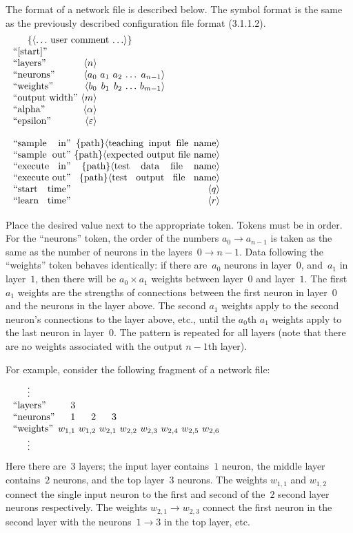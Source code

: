 \documentclass[12pt]{report}
\begin{document}
The format of a network file is described below.
The symbol format is the same as the previously described
configuration file format (3.1.1.2).
$$\vbox{
\halign{#&&\ #\cr
	\noalign{$\{\langle \ldots$ user comment $\ldots \rangle\}$}
	\noalign{}
	``[start]''\cr
	\noalign{}
	``layers''&$\langle n\rangle$\cr
	``neurons''&$\langle a_0$&$a_1$&$a_2$&$\ldots$&$a_{n-1}\rangle$\cr
	``weights''&$\langle b_0$&$b_1$&$b_2$&$\ldots$&$b_{m-1}\rangle$\cr
	\noalign{}
	``output width''&$\langle m\rangle$\cr
	\noalign{}
	``alpha''&$\langle\alpha\rangle$\cr
	``epsilon''&$\langle\varepsilon\rangle$\cr
}}
$$
$$\vbox{
\halign{#&\ #\cr
	\noalign{$\quad$}
	``sample in''&$\{$path$\}\langle$teaching input file name$\rangle$\cr
	``sample out''&$\{$path$\}\langle$expected output file name$\rangle$\cr
	\noalign{}
	``execute in''&$\{$path$\}\langle$test data file name$\rangle$\cr
	``execute out''&$\{$path$\}\langle$test output file name$\rangle$\cr
	\noalign{}
	``start time''&$\langle q\rangle$\cr
	``learn time''&$\langle r\rangle$\cr
}}
$$

Place the desired value next to the appropriate token.
Tokens must be in order.
For the ``neurons'' token, the order of the numbers $a_0\to a_{n-1}$ is
taken as the same as the number of neurons in the layers~$0\to n-1$.
Data following the ``weights'' token behaves identically: if there
are~$a_0$ neurons in layer~$0$, and~$a_1$ in layer~$1$, then there
will be $a_0 \times a_1$ weights between layer~$0$ and layer~$1$.
The first $a_1$ weights are the strengths of connections between
the first neuron in layer~$0$ and the neurons in the layer above.
The second $a_1$ weights apply to the second neuron's connections to
the layer above, etc., until the $a_0$th $a_1$ weights apply to the
last neuron in layer~$0$.
The pattern is repeated for all layers (note that there are no weights
associated with the output $n-1$th layer).

For example, consider the following fragment of a network file:
$$\vbox{
\halign{#&&\ #\cr
	\noalign{$\vdots$}
	``layers''&$3$\cr
	``neurons''&$1$&$2$&$3$\cr
	``weights''&$w_{1,1}$&$w_{1,2}$&$w_{2,1}$&$w_{2,2}$&
		$w_{2,3}$&$w_{2,4}$&$w_{2,5}$&$w_{2,6}$\cr
	\noalign{$\vdots$}
}}
$$
Here there are~$3$ layers; the input layer contains~$1$ neuron, the
middle layer contains~$2$ neurons, and the top layer~$3$ neurons.
The weights $w_{1,1}$ and $w_{1,2}$ connect the single input neuron to the
first and second of the~$2$ second layer neurons respectively.
The weights $w_{2,1}\to w_{2,3}$ connect the first neuron in the
second layer with the neurons~$1\to 3$ in the top layer, etc.
\end{document}
